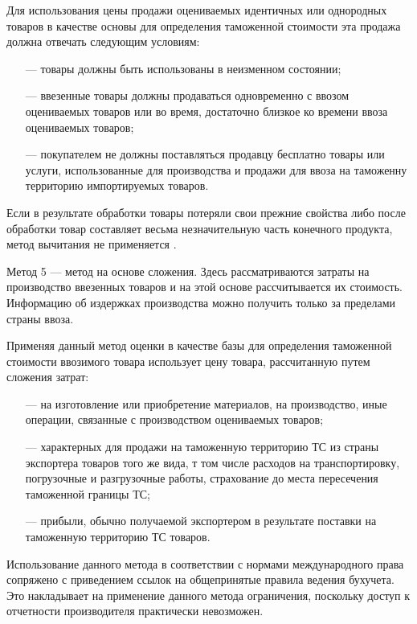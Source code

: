 Для использования цены продажи оцениваемых идентичных или однородных товаров в качестве основы для определения таможенной стоимости эта продажа должна отвечать следующим условиям:
\begin{enumerate}
	\item [---] товары должны быть использованы в неизменном состоянии;
	\item [---] ввезенные товары должны продаваться одновременно с ввозом оцениваемых товаров или во время, достаточно близкое ко времени ввоза оцениваемых товаров;
	\item [---] покупателем не должны поставляться продавцу бесплатно товары или услуги, использованные для производства и продажи для ввоза на таможенну территорию импортируемых товаров.
\end{enumerate}

Если в результате обработки товары потеряли свои прежние свойства либо после обработки товар составляет весьма незначительную часть конечного продукта, метод вычитания не применяется \cites[с. 271--275]{mahovikova}[с. 130--131]{novikova}.

Метод 5 --- метод на основе сложения. Здесь рассматриваются затраты на производство ввезенных товаров и на этой основе рассчитывается их стоимость. Информацию об издержках производства можно получить только за пределами страны ввоза.

Применяя данный метод оценки в качестве базы для определения таможенной стоимости ввозимого товара использует цену товара, рассчитанную путем сложения затрат:
\begin{enumerate}
	\item [---] на изготовление или приобретение материалов, на производство, иные операции, связанные с производством оцениваемых товаров;
	\item [---] характерных для продажи на таможенную территорию ТС из страны экспортера товаров того же вида, т том числе расходов на транспортировку, погрузочные и разгрузочные работы, страхование до места пересечения таможенной границы ТС;
	\item [---] прибыли, обычно получаемой экспортером в результате поставки на таможенную территорию ТС товаров.
\end{enumerate}

Использование данного метода в соответствии с нормами международного права сопряжено с приведением ссылок на общепринятые правила ведения бухучета. Это накладывает на применение данного метода ограничения, поскольку доступ к отчетности производителя практически невозможен.


